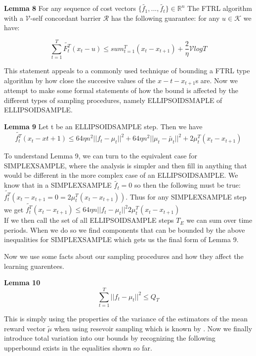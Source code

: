\textbf{Lemma 8}
For any sequence of cost vectors $\{\tilde{f_1}, ...,\tilde{f_t}\} \in \mathbb{R}^n$
The FTRL algorithm with a $\mathcal{V}$-self concordant barrier $\mathcal{R}$ has the following
guarantee: for any $u \in \mathcal{K}$ we have:

\begin{equation}
  \sum_{t=1}^T \tilde{F_{t}^T} (x_t - u) \leq sum_{t=1}^T (x_t - x_{t+1}) + \frac{2}{\eta}\mathcal{V}  log T
\end{equation}

This statement appeals to a commonly used technique of bounding a FTRL type algorithm by how close the succesive values of the $x-t - x_{t+1}$s are. 
Now we attempt to make some formal statements of how the bound is affected by the different types of sampling procedures, namely ELLIPSOIDSMAPLE of ELLIPSOIDSAMPLE.

\textbf{Lemma 9}
Let t be an ELLIPSOIDSAMPLE step. Then we have 
\begin{equation}
  \tilde{f_t^T}(x_t - x{t+1}) \leq 64 \eta n^2 ||f_t - \mu_t ||^2 + 64 \eta n^2 ||\mu_t -\tilde{\mu_t} ||^2 + 2 \mu_t^T (x_t - x_{t+1}) 
\end{equation} 

To understand Lemma 9, we can turn to the equivalent case for SIMPLEXSAMPLE, where the analysis
is simpler and then fill in anything that would be different in the more complex case of an ELLIPSOIDSAMPLE. We know that in a SIMPLEXSAMPLE $\tilde{f_t} = 0$ so then the following must be true: 
$\tilde{f_t^T}(x_t - x_{t+1} = 0 = 2 \mu_t^T (x_t - x_{t+1}))$. Thus for any SIMPLEXSAMPLE step we get $\tilde{f_t^T}(x_t - x_{t+1}) \leq 64 \eta n ||f_t - \mu_t ||^2 2\mu_t^T (x_t - x_{t+1})$ \\

If we then call the set of all ELLIPSOIDSAMPLE steps $T_E$ we can sum over time periods. When we do so we find components that can be bounded by the above inequalities for SIMPLEXSAMPLE which gets us the final form of Lemma 9.

Now we use some facts about our sampling procedures and how they affect the learning guarentees.

\textbf{Lemma 10}
\begin{equation}
  \sum_{t=1}^T ||f_t - \mu_t||^2 \leq Q_T
\end{equation}

This is simply using the properties of the variance of the estimators of the mean reward vector $\tilde{\mu}$ when using resevoir sampling which is known by \citep{vitter}.
Now we finally introduce total variation into our bounds by recognizing the following upperbound exists in the equalities shown so far.

